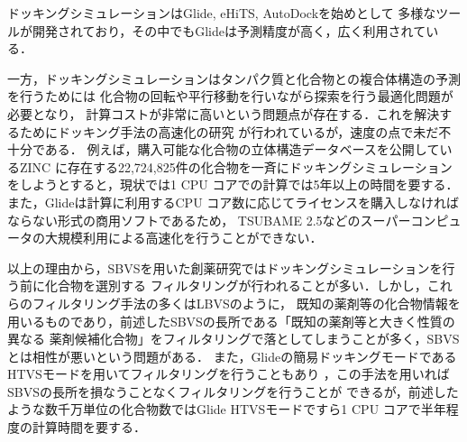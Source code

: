 ドッキングシミュレーションはGlide\cite{Friesner2004}, eHiTS\cite{Zsoldos2007}, AutoDock\cite{Morris2009}を始めとして
多様なツールが開発されており，その中でもGlideは予測精度が高く\cite{Kruger2010}，広く利用されている\cite{Yuriev2013}．

一方，ドッキングシミュレーションはタンパク質と化合物との複合体構造の予測を行うためには
化合物の回転や平行移動を行いながら探索を行う最適化問題が必要となり，
計算コストが非常に高いという問題点が存在する．これを解決するためにドッキング手法の高速化の研究\cite{Kannan2010, McIntosh-Smith2014, Trott2010}
が行われているが，速度の点で未だ不十分である．
例えば，購入可能な化合物の立体構造データベースを公開しているZINC
\cite{Irwin2005}に存在する22,724,825件の化合物を一斉にドッキングシミュレーションをしようとすると，現状では1 CPU コアでの計算では5年以上の時間を要する．
また，Glideは計算に利用するCPU コア数に応じてライセンスを購入しなければならない形式の商用ソフトであるため，
TSUBAME 2.5などのスーパーコンピュータの大規模利用による高速化を行うことができない．
%

以上の理由から，SBVSを用いた創薬研究ではドッキングシミュレーションを行う前に化合物を選別する
フィルタリングが行われることが多い\cite{Nilakantan1993, Parenti2003}．しかし，これらのフィルタリング手法の多くはLBVSのように，
既知の薬剤等の化合物情報を用いるものであり，前述したSBVSの長所である「既知の薬剤等と大きく性質の異なる
薬剤候補化合物」をフィルタリングで落としてしまうことが多く，SBVSとは相性が悪いという問題がある．
また，Glideの簡易ドッキングモードであるHTVSモードを用いてフィルタリングを行うこともあり
\cite{Fujimoto2008, Grover2012}，この手法を用いればSBVSの長所を損なうことなくフィルタリングを行うことが
できるが，前述したような数千万単位の化合物数ではGlide HTVSモードですら1 CPU コアで半年程度の計算時間を要する．


